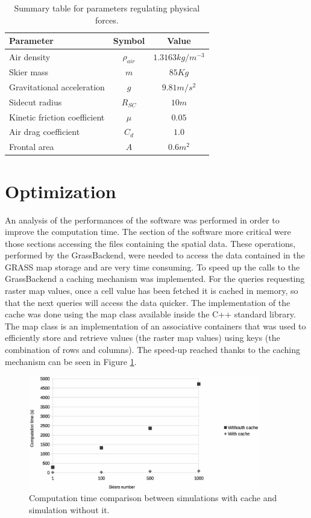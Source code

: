 \documentclass[12pt,a4paper,twoside]{book}
\begin{document}
\begin{table}
  \centering
  \begin{tabular}{ l | c | c }
    \hline
    Parameter & Symbol & Value \\
    \hline
    Air density & $\rho_{air}$ & $1.3163 kg/m^{-3}$ \\
    Skier mass & $m$ & $85 Kg$ \\
    Gravitational acceleration & $g$ & $9.81 m/s^2$ \\
    Sidecut radius & $R_{SC}$ & $10m$ \\
    Kinetic friction coefficient & $\mu$ & $0.05$ \\
    Air drag coefficient & $C_d$ & $1.0$ \\
    Frontal area & $A$ & $0.6 m^2$ \\
    \hline
  \end{tabular}
  \caption{Summary table for parameters regulating physical forces.}
  \label{physical_parameters_table}
\end{table}

\section{Optimization}
An analysis of the performances of the software was performed in order to improve the computation time. The section of the software more critical were those sections accessing the files containing the spatial data. These operations, performed by the GrassBackend, were needed to access the data contained in the GRASS map storage and are very time consuming. To speed up the calls to the GrassBackend a caching mechanism was implemented. For the queries requesting raster map values, once a cell value has been fetched it is cached in memory, so that the next queries will access the data quicker. The implementation of the cache was done using the map class available inside the C++ standard library. The map class is an implementation of an associative containers that was used to efficiently store and retrieve values (the raster map values) using keys (the combination of rows and columns). The speed-up reached thanks to the caching mechanism can be seen in Figure \ref{speed-up_cache}.

\begin{figure}[!h]
  \begin{center}
    \includegraphics[width=0.9\textwidth]{images/caching.eps}
    \caption{Computation time comparison between simulations with cache and simulation without it.}\label{speed-up_cache}
  \end{center}
\end{figure}
\end{document}
